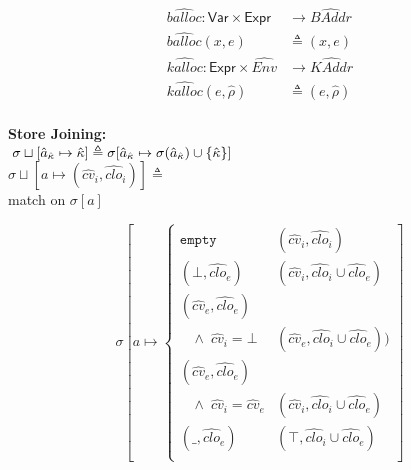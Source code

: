 \documentclass[12pt,draft]{article}
\newcommand{\store}[0]{\sigma}
\begin{document}
\begin{multicols*}{2}
  \vspace{-7mm}
  \begin{align*}
    \widehat{balloc}:\textsf{Var} \times \textsf{Expr} &\rightarrow \widehat{\textit{BAddr}} \\
    \widehat{balloc}(x, e) &\triangleq (x, e) \\
    \widehat{kalloc}:\textsf{Expr} \times \widehat{\textit{Env}} &\rightarrow \widehat{\textit{KAddr}} \\
    \widehat{kalloc}(e, \hat{\rho}) &\triangleq (e, \hat{\rho}) \\
  \end{align*}
  \begin{center}
    \textbf{Store Joining:} \\
    $\;\store \sqcup [\akaddr \mapsto \akont]
    \triangleq \store[\akaddr \mapsto \store(\akaddr) \cup \{\akont\}]$ \\
    $\store \sqcup [a \mapsto (\hat{cv}_i, \widehat{clo}_i)] \triangleq$ \\
    match on $\store[a]$
  \end{center}
  \[
    \store[a \mapsto \begin{cases}
      \texttt{empty}
      & (\hat{cv}_i, \widehat{clo}_i) \\
      (\bot, \widehat{clo}_e)
      & (\hat{cv}_i , \widehat{clo}_i \cup \widehat{clo}_e) \\
      (\hat{cv}_e, \widehat{clo}_e) \\
      \;\;\; \land \; \hat{cv}_i = \bot
      & (\hat{cv}_e , \widehat{clo}_i \cup \widehat{clo}_e)) \\
      (\hat{cv}_e , \widehat{clo}_e) \\
      \;\;\; \land \; \hat{cv}_i = \hat{cv}_e
      & (\hat{cv}_i , \widehat{clo}_i \cup \widehat{clo}_e) \\
      (\_, \widehat{clo}_e)
      & (\top , \widehat{clo}_i \cup \widehat{clo}_e) \\
    \end{cases}]
  \]
\end{multicols*}

\newpage
\end{document}
